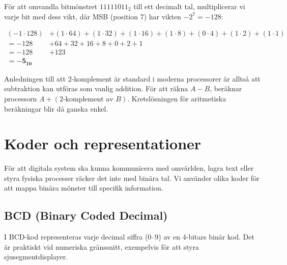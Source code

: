 \documentclass[
  swedish,
  letterpaper,
  oneside,
  openany]{book}
\begin{document}
\begin{tcolorbox}[enhanced jigsaw, arc=.35mm, bottomrule=.15mm, bottomtitle=1mm, breakable, colback=white, colbacktitle=quarto-callout-note-color!10!white, colframe=quarto-callout-note-color-frame, coltitle=black, left=2mm, leftrule=.75mm, opacityback=0, opacitybacktitle=0.6, rightrule=.15mm, title=\textcolor{quarto-callout-note-color}{\faInfo}\hspace{0.5em}{Exempel: Tolkning av \(-5_{10}\) i 8-bitars 2-komplement}, titlerule=0mm, toprule=.15mm, toptitle=1mm]

För att omvandla bitmönstret \(11111011_2\) till ett decimalt tal,
multiplicerar vi varje bit med dess vikt, där MSB (position 7) har
vikten \(-2^7 = -128\):

\[
\begin{aligned}
(-1 \cdot 128) &+ (1 \cdot 64) + (1 \cdot 32) + (1 \cdot 16) + (1 \cdot 8) + (0 \cdot 4) + (1 \cdot 2) + (1 \cdot 1) \\
= -128 &+ 64 + 32 + 16 + 8 + 0 + 2 + 1 \\
= -128 &+ 123 \\
= \mathbf{-5_{10}}
\end{aligned}
\]

\end{tcolorbox}

Anledningen till att 2-komplement är standard i moderna processorer är
alltså att subtraktion kan utföras som vanlig addition. För att räkna
\(A - B\), beräknar processorn \(A + (\text{2-komplement av } B)\).
Kretslösningen för aritmetiska beräkningar blir då ganska enkel.

\section{Koder och representationer}\label{koder-och-representationer}

För att digitala system ska kunna kommunicera med omvärlden, lagra text
eller styra fysiska processer räcker det inte med binära tal. Vi
använder olika koder för att mappa binära mönster till specifik
information.

\subsection{BCD (Binary Coded Decimal)}\label{bcd-binary-coded-decimal}

I BCD-kod representeras varje decimal siffra (0--9) av en 4-bitars binär
kod. Det är praktiskt vid numeriska gränssnitt, exempelvis för att styra
sjusegmentdisplayer.
\end{document}
